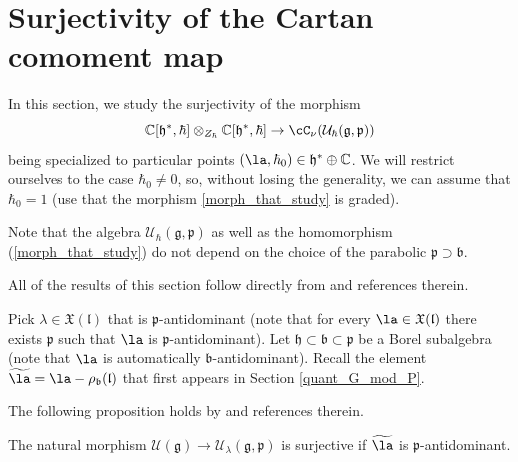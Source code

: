 \documentclass[12pt]{amsart}
\begin{document}

\section{Surjectivity of the Cartan comoment map}\label{app_surj_rhs}
In this section, we study the surjectivity of the morphism 
\begin{equation}\label{morph_that_study}
\mathbb{C}[\mathfrak{h}^*,\hbar] \otimes_{Z_\hbar} \mathbb{C}[\mathfrak{h}^*,\hbar] \rightarrow \cC_\nu(\mathcal{U}_\hbar(\mathfrak{g},\mathfrak{p}))
\end{equation} 
being specialized to particular points $(\la,\hbar_0) \in \mathfrak{h}^* \oplus \mathbb{C}$. We will restrict ourselves to the case $\hbar_0 \neq 0$, so, without losing the generality, we can assume that $\hbar_0=1$ (use that the morphism \ref{morph_that_study} is graded).  

\begin{rmk}
Note that the algebra $\mathcal{U}_\hbar(\mathfrak{g},\mathfrak{p})$ as well as the homomorphism (\ref{morph_that_study}) do not depend on the choice of the parabolic $\mathfrak{p} \supset \mathfrak{b}$. 
\end{rmk}

	



All of the results of this section follow directly from \cite[Section 3]{HolandPolo} and references therein. 

Pick $\lambda \in \mathfrak{X}(\mathfrak{l})$ that is  $\mathfrak{p}$-antidominant (note that for every $\la \in \mathfrak{X}(\mathfrak{l})$ there exists $\mathfrak{p}$ such that $\la$ is $\mathfrak{p}$-antidominant). Let $\mathfrak{h} \subset \mathfrak{b} \subset \mathfrak{p}$ be a Borel subalgebra (note that $\la$ is automatically $\mathfrak{b}$-antidominant). Recall the element $\widetilde{\la}=\la-\rho_{\mathfrak{b}}(\mathfrak{l})$ that first appears in Section \ref{quant_G_mod_P}.



The following proposition holds by \cite[Section 3.6]{HolandPolo} and references therein.
\begin{prop}
The natural morphism $\mathcal{U}(\mathfrak{g}) \rightarrow \mathcal{U}_\lambda(\mathfrak{g},\mathfrak{p})$ is surjective if $\widetilde{\la}$ is 
$\mathfrak{p}$-antidominant.  
\end{prop}
\end{document}
